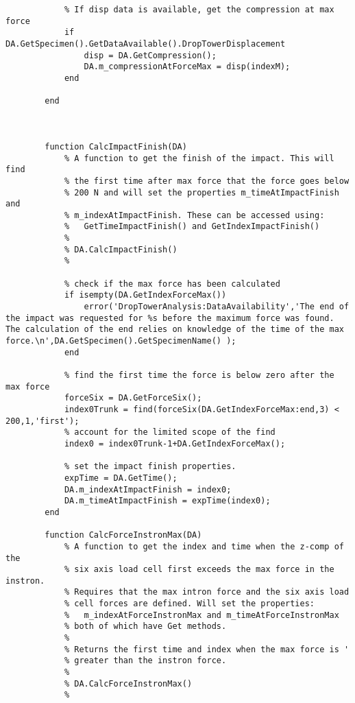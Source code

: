 \begin{lstlisting}
            % If disp data is available, get the compression at max force
            if DA.GetSpecimen().GetDataAvailable().DropTowerDisplacement
                disp = DA.GetCompression();
                DA.m_compressionAtForceMax = disp(indexM);
            end
            
        end
            
            
      
        function CalcImpactFinish(DA)
            % A function to get the finish of the impact. This will find
            % the first time after max force that the force goes below
            % 200 N and will set the properties m_timeAtImpactFinish and
            % m_indexAtImpactFinish. These can be accessed using:
            %   GetTimeImpactFinish() and GetIndexImpactFinish()
            %
            % DA.CalcImpactFinish()
            %
            
            % check if the max force has been calculated
            if isempty(DA.GetIndexForceMax())
                error('DropTowerAnalysis:DataAvailability','The end of the impact was requested for %s before the maximum force was found. The calculation of the end relies on knowledge of the time of the max force.\n',DA.GetSpecimen().GetSpecimenName() );
            end
            
            % find the first time the force is below zero after the max force
            forceSix = DA.GetForceSix();
            index0Trunk = find(forceSix(DA.GetIndexForceMax:end,3) < 200,1,'first');
            % account for the limited scope of the find
            index0 = index0Trunk-1+DA.GetIndexForceMax();
            
            % set the impact finish properties.
            expTime = DA.GetTime();
            DA.m_indexAtImpactFinish = index0;
            DA.m_timeAtImpactFinish = expTime(index0);
        end
        
        function CalcForceInstronMax(DA)
            % A function to get the index and time when the z-comp of the
            % six axis load cell first exceeds the max force in the instron.
            % Requires that the max intron force and the six axis load
            % cell forces are defined. Will set the properties:
            %   m_indexAtForceInstronMax and m_timeAtForceInstronMax
            % both of which have Get methods.
            %
            % Returns the first time and index when the max force is '
            % greater than the instron force.
            %
            % DA.CalcForceInstronMax()
            %
            

\end{lstlisting}
